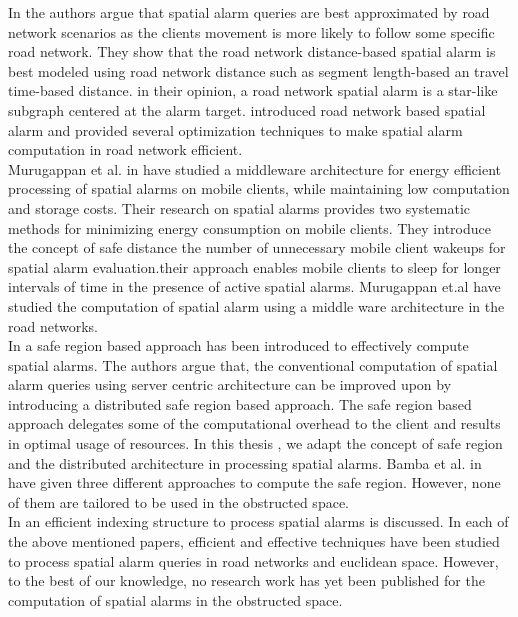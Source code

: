 \label{sec:roadalarm}
In \cite{roadalarm} the authors argue that spatial alarm queries are best approximated by road network scenarios as the clients movement is more likely to follow some specific road network. They show that the road network distance-based spatial alarm is best modeled using road network distance such as segment length-based an travel time-based distance. in their opinion, a road network spatial alarm is a star-like subgraph centered at the alarm target. \cite{roadalarm} introduced road network based spatial alarm and provided several optimization techniques to make spatial alarm computation in road network efficient.\\


Murugappan et al. in \cite{mur} have studied a middleware architecture for energy efficient processing of spatial alarms on mobile clients, while maintaining low computation and storage costs. Their research on  spatial alarms provides two systematic methods for minimizing energy consumption on mobile clients. They introduce  the concept of safe distance the number of unnecessary mobile client wakeups for spatial alarm
evaluation.their approach enables mobile clients to sleep for longer intervals of time in the presence of active spatial alarms. Murugappan et.al have studied the computation of spatial alarm using a middle ware architecture in the road networks. \\

In \cite{bamba} a safe region based approach has been introduced to effectively compute spatial alarms. The authors argue that, the conventional computation of spatial alarm queries using server centric architecture can be improved upon by introducing a distributed safe region based approach. The safe region based approach delegates some of the computational overhead to the client and results in optimal usage of resources. In this thesis , we adapt the concept of safe region and the distributed architecture in processing spatial alarms. Bamba et al. in \cite{bamba} have given three different approaches to compute the safe region. However, none of them are tailored to be used in the obstructed space. \\
 
In \cite{liu} an efficient indexing structure to process spatial alarms is discussed. In each of the above mentioned papers, efficient and effective techniques have been studied to process spatial alarm queries in road networks and euclidean space. However, to the best of our knowledge, no research work has yet been published for the computation of spatial alarms in the obstructed space. 

